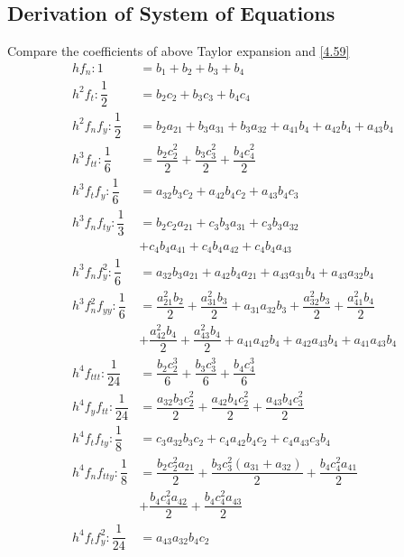 \documentclass[a4paper,oneside]{book}
\numberwithin{equation}{chapter}
\begin{document}
\subsection{Derivation of System of Equations}
Compare the coefficients of above Taylor expansion  and \eqref{4.59}
\begin{align}
h{f_n}:1 &= {b_1} + {b_2} + {b_3} + {b_4}\\
{h^2}{f_t}:\dfrac{1}{2} &= {b_2}{c_2} + {b_3}{c_3} + {b_4}{c_4}\\
{h^2}{f_n}{f_y}:\dfrac{1}{2} &= {b_2}{a_{21}} + {b_3}{a_{31}} + {b_3}{a_{32}} + {a_{41}}{b_4} + {a_{42}}{b_4} + {a_{43}}{b_4}\\
{h^3}{f_{tt}}:\dfrac{1}{6} &= \dfrac{{{b_2}c_2^2}}{2} + \dfrac{{{b_3}c_3^2}}{2} + \dfrac{{{b_4}c_4^2}}{2}\\
{h^3}{f_t}{f_y}:\dfrac{1}{6} &= {a_{32}}{b_3}{c_2} + {a_{42}}{b_4}{c_2} + {a_{43}}{b_4}{c_3}\\
{h^3}{f_n}{f_{ty}}:\dfrac{1}{3} &= {b_2}{c_2}{a_{21}} + {c_3}{b_3}{a_{31}} + {c_3}{b_3}{a_{32}}\\
& + {c_4}{b_4}{a_{41}} + {c_4}{b_4}{a_{42}} + {c_4}{b_4}{a_{43}}\\
{h^3}{f_n}f_y^2:\dfrac{1}{6} &= {a_{32}}{b_3}{a_{21}} + {a_{42}}{b_4}{a_{21}} + {a_{43}}{a_{31}}{b_4} + {a_{43}}{a_{32}}{b_4}\\
{h^3}f_n^2{f_{yy}}:\dfrac{1}{6} &= \dfrac{{a_{21}^2{b_2}}}{2} + \dfrac{{a_{31}^2{b_3}}}{2} + {a_{31}}{a_{32}}{b_3} + \dfrac{{a_{32}^2{b_3}}}{2} + \dfrac{{a_{41}^2{b_4}}}{2} \\
 &+ \dfrac{{a_{42}^2{b_4}}}{2} + \dfrac{{a_{43}^2{b_4}}}{2} + {a_{41}}{a_{42}}{b_4} + {a_{42}}{a_{43}}{b_4} + {a_{41}}{a_{43}}{b_4}\\
{h^4}{f_{ttt}}:\dfrac{1}{{24}} &= \dfrac{{{b_2}c_2^3}}{6} + \dfrac{{{b_3}c_3^3}}{6} + \dfrac{{{b_4}c_4^3}}{6}\\
{h^4}{f_y}{f_{tt}}:\dfrac{1}{{24}} &= \dfrac{{{a_{32}}{b_3}c_2^2}}{2} + \dfrac{{{a_{42}}{b_4}c_2^2}}{2} + \dfrac{{{a_{43}}{b_4}c_3^2}}{2}\\
{h^4}{f_t}{f_{ty}}:\dfrac{1}{8} &= {c_3}{a_{32}}{b_3}{c_2} + {c_4}{a_{42}}{b_4}{c_2} + {c_4}{a_{43}}{c_3}{b_4}\\
{h^4}{f_n}{f_{tty}}:\dfrac{1}{8} &= \dfrac{{{b_2}c_2^2{a_{21}}}}{2} + \dfrac{{{b_3}c_3^2\left( {{a_{31}} + {a_{32}}} \right)}}{2} + \dfrac{{{b_4}c_4^2{a_{41}}}}{2} \\
&+ \dfrac{{{b_4}c_4^2{a_{42}}}}{2} + \dfrac{{{b_4}c_4^2{a_{43}}}}{2}\\
{h^4}{f_t}f_y^2:\dfrac{1}{{24}} &= {a_{43}}{a_{32}}{b_4}{c_2}\\

\end{align}
\end{document}
